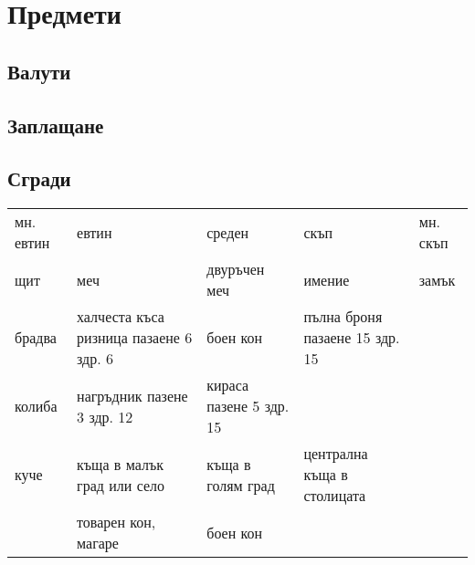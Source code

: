 \section{Предмети}
\subsection{Валути}
\subsection{Заплащане}
\subsection{Сгради}
\begin{tabular}{p{3cm} | p{3cm} | p{3cm} | p{3cm} | p{3cm}}
мн. евтин & евтин                                   & среден                  & скъп                           & мн. скъп  \\
щит       & меч                                     & двуръчен меч            & имение                         & замък     \\
брадва    & халчеста къса ризница пазаене 6 здр. 6  & боен кон                & пълна броня пазаене 15 здр. 15 &           \\
колиба    & нагръдник пазене 3 здр. 12              & кираса пазене 5 здр. 15 &                                &           \\
куче      & къща в малък град или село              & къща в голям град       & централна къща в столицата                 \\
          & товарен кон, магаре                     & боен кон                &
\end{tabular}
